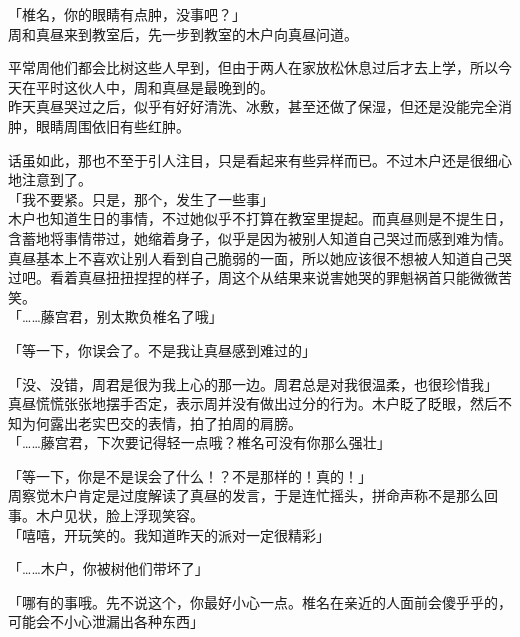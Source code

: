 \vspace{2\baselineskip}

「椎名，你的眼睛有点肿，没事吧？」\\

周和真昼来到教室后，先一步到教室的木户向真昼问道。

平常周他们都会比树这些人早到，但由于两人在家放松休息过后才去上学，所以今天在平时这伙人中，周和真昼是最晚到的。\\

昨天真昼哭过之后，似乎有好好清洗、冰敷，甚至还做了保湿，但还是没能完全消肿，眼睛周围依旧有些红肿。

话虽如此，那也不至于引人注目，只是看起来有些异样而已。不过木户还是很细心地注意到了。\\

「我不要紧。只是，那个，发生了一些事」\\

木户也知道生日的事情，不过她似乎不打算在教室里提起。而真昼则是不提生日，含蓄地将事情带过，她缩着身子，似乎是因为被别人知道自己哭过而感到难为情。\\

真昼基本上不喜欢让别人看到自己脆弱的一面，所以她应该很不想被人知道自己哭过吧。看着真昼扭扭捏捏的样子，周这个从结果来说害她哭的罪魁祸首只能微微苦笑。\\

「……藤宫君，别太欺负椎名了哦」

「等一下，你误会了。不是我让真昼感到难过的」

「没、没错，周君是很为我上心的那一边。周君总是对我很温柔，也很珍惜我」\\

真昼慌慌张张地摆手否定，表示周并没有做出过分的行为。木户眨了眨眼，然后不知为何露出老实巴交的表情，拍了拍周的肩膀。\\

「……藤宫君，下次要记得轻一点哦？椎名可没有你那么强壮」

「等一下，你是不是误会了什么！？不是那样的！真的！」\\

周察觉木户肯定是过度解读了真昼的发言，于是连忙摇头，拼命声称不是那么回事。木户见状，脸上浮现笑容。\\

「嘻嘻，开玩笑的。我知道昨天的派对一定很精彩」

「……木户，你被树他们带坏了」

「哪有的事哦。先不说这个，你最好小心一点。椎名在亲近的人面前会傻乎乎的，可能会不小心泄漏出各种东西」

